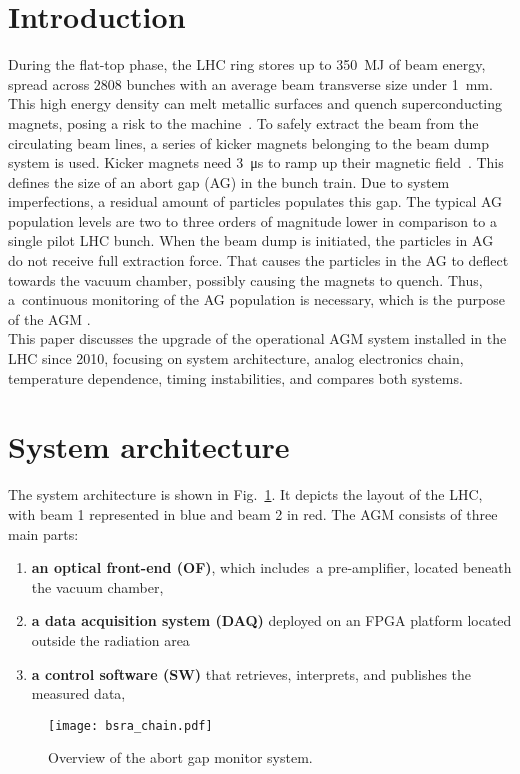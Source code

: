 \section{Introduction}
During the flat-top phase, the LHC ring stores up to \SI{350}{MJ} of beam energy, spread across 2808 bunches with an average beam transverse size under \SI{1}{mm}.
%
This high energy density can melt metallic surfaces and quench
superconducting magnets, posing a risk to the machine~\cite{LHC_report}.
%
To safely extract the beam from the circulating beam lines, a series of kicker magnets belonging to the beam dump system is used. 
%
Kicker magnets need \SI{3}{\micro\second} to ramp up their magnetic field~\cite{beam_dump_system}.
%
This defines the size of an abort gap (AG) in the bunch train.
%
Due to system imperfections, a residual amount of particles populates this gap.
%
The typical AG population levels are two to three orders of magnitude lower in comparison to a single pilot LHC bunch.
%
When the beam dump is initiated, the particles in AG do not receive full
extraction force.
%
That causes the particles in the AG to deflect towards the vacuum chamber, possibly causing the magnets to quench. 
%
Thus, a~continuous monitoring of the AG population is necessary, which is the purpose of the AGM \cite{particles_in_ag}.
\\
This paper discusses the upgrade of the operational AGM system installed in the LHC since 2010, focusing on system architecture, analog electronics chain, temperature dependence, timing instabilities, and compares both systems.

\section{System architecture}
The system architecture is shown in Fig.~\ref{fig:bsra_chain}.
%
It depicts the layout of the LHC, with beam 1 represented in blue and beam 2 in red.
%
The AGM consists of three main parts:
%
\begin{enumerate}
    \item \textbf{an optical front-end (OF)}, which includes~a pre-amplifier, located beneath the vacuum chamber,
    \item \textbf{a data acquisition system (DAQ)} deployed on an FPGA platform located outside the radiation area
    \item \textbf{a control software (SW)} that retrieves, interprets, and publishes the measured data,
\end{enumerate}
%
\begin{figure}[!tbh]
    \centering
    \texttt{[image: bsra\_chain.pdf]}
    \caption{Overview of the abort gap monitor system.}
    \label{fig:bsra_chain}
\end{figure} 

